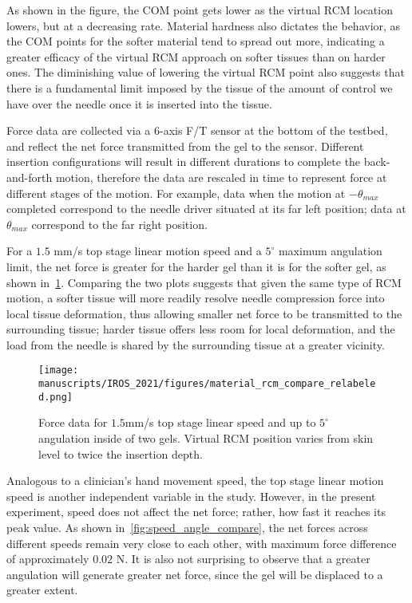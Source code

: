 As shown in the figure, the COM point gets lower as the virtual RCM location lowers, but at a decreasing rate. Material hardness also dictates the behavior, as the COM points for the softer material tend to spread out more, indicating a greater efficacy of the virtual RCM approach on softer tissues than on harder ones. The diminishing value of lowering the virtual RCM point also suggests that there is a fundamental limit imposed by the tissue of the amount of control we have over the needle once it is inserted into the tissue.

Force data are collected via a 6-axis F/T sensor at the bottom of the testbed, and reflect the net force transmitted from the gel to the sensor. Different insertion configurations will result in different durations to complete the back-and-forth motion, therefore the data are rescaled in time to represent force at different stages of the motion. For example, data when the motion at $-\theta_{max}$ completed correspond to the needle driver situated at its far left position; data at $\theta_{max}$ correspond to the far right position.

For a $1.5$ mm/s top stage linear motion speed and a $5^\circ$ maximum angulation limit, the net force is greater for the harder gel than it is for the softer gel, as shown in~\cref{fig:material_rcm_compare}. Comparing the two plots suggests that given the same type of RCM motion, a softer tissue will more readily resolve needle compression force into local tissue deformation, thus allowing smaller net force to be transmitted to the surrounding tissue; harder tissue offers less room for local deformation, and the load from the needle is shared by the surrounding tissue at a greater vicinity.

\begin{figure}[tb]
  \centering
  \texttt{[image: manuscripts/IROS\_2021/figures/material\_rcm\_compare\_relabeled.png]}
  \caption{Force data for $1.5$mm/s top stage linear speed and up to $5^\circ$ angulation inside of two gels. Virtual RCM position varies from skin level to twice the insertion depth.}
  \label{fig:material_rcm_compare}
\end{figure}

Analogous to a clinician's hand movement speed, the top stage linear motion speed is another independent variable in the study. However, in the present experiment, speed does not affect the net force; rather, how fast it reaches its peak value. As shown in~\cref{fig:speed_angle_compare}, the net forces across different speeds remain very close to each other, with maximum force difference of approximately $0.02$ N. It is also not surprising to observe that a greater angulation will generate greater net force, since the gel will be displaced to a greater extent.

